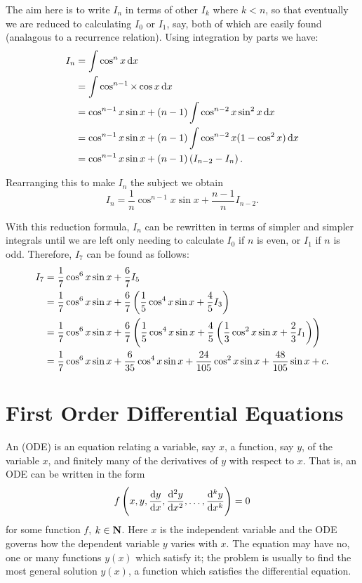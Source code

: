 \begin{solution}
The aim here is to write $I_n$ in terms of other $I_k$ where $k<n$, so that eventually we are reduced to calculating $I_0$ or $I_1$, say, both of which are easily found (analagous to a recurrence relation). Using integration by parts we have:
\begin{align*}
I_n&=\int\cos^n x\dd{x}\\
&=\int\cos^{n-1}\times\cos x\dd{x}\\
&=\cos^{n-1}x\sin x+(n-1)\int\cos^{n-2}x\sin^2 x\dd{x}\\
&=\cos^{n-1}x\sin x+(n-1)\int\cos^{n-2}x(1-\cos^2 x)\dd{x}\\
&=\cos^{n-1}x\sin x+(n-1)\left(I_{n-2}-I_n\right).
\end{align*}

Rearranging this to make $I_n$ the subject we obtain
\[I_n=\frac{1}{n}\cos^{n-1}x\sin x+\frac{n-1}{n}I_{n-2}.\]

With this reduction formula, $I_n$ can be rewritten in terms of simpler and simpler integrals until we are left only needing to calculate $I_0$ if $n$ is even, or $I_1$ if $n$ is odd. Therefore, $I_7$ can be found as follows:
\begin{align*}
I_7&=\frac{1}{7}\cos^6x\sin x+\frac{6}{7}I_5\\
&=\frac{1}{7}\cos^6x\sin x+\frac{6}{7}\left(\frac{1}{5}\cos^4x\sin x+\frac{4}{5}I_3\right)\\
&=\frac{1}{7}\cos^6x\sin x+\frac{6}{7}\left(\frac{1}{5}\cos^4x\sin x+\frac{4}{5}\left(\frac{1}{3}\cos^2x\sin x+\frac{2}{3}I_1\right)\right)\\
&=\frac{1}{7}\cos^6x\sin x+\frac{6}{35}\cos^4x\sin x+\frac{24}{105}\cos^2x\sin x+\frac{48}{105}\sin x+c.
\end{align*}
\end{solution}

\section{First Order Differential Equations}
An  (ODE) is an equation relating a variable, say $x$, a function, say $y$, of the variable $x$, and finitely many of the derivatives of $y$ with respect to $x$. That is, an ODE can be written in the form
\[f\left(x,y,\dv{y}{x},\dv[2]{y}{x},\dots,\dv[k]{y}{x}\right)=0\]
for some function $f$, $k\in\mathbf N$. Here $x$ is the independent variable and the ODE governs how the dependent variable $y$ varies with $x$. The equation may have no, one or many functions $y(x)$ which satisfy it; the problem is usually to find the most general solution $y(x)$, a function which satisfies the differential equation.

